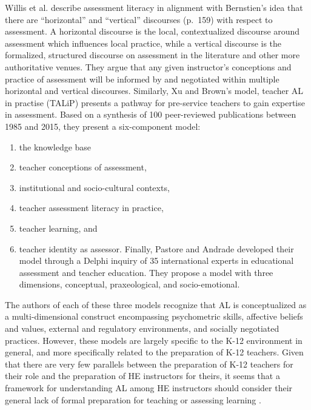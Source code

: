 \documentclass[
]{book}
\providecommand{\tightlist}{%
  \setlength{\itemsep}{0pt}\setlength{\parskip}{0pt}}
\begin{document}
Willis et al. \citeyearpar{willisConceptualisingTeachersAssessment2013} describe assessment literacy in alignment with Bernstien's \citeyearpar{bernsteinVerticalHorizontalDiscourse1999} idea that there are ``horizontal'' and ``vertical'' discourses (p.~159) with respect to assessment. A horizontal discourse is the local, contextualized discourse around assessment which influences local practice, while a vertical discourse is the formalized, structured discourse on assessment in the literature and other more authoritative venues. They argue that any given instructor's conceptions and practice of assessment will be informed by and negotiated within multiple horizontal and vertical discourses. Similarly, Xu and Brown's \citeyearpar{xuTeacherAssessmentLiteracy2016} model, teacher AL in practise (TALiP) presents a pathway for pre-service teachers to gain expertise in assessment. Based on a synthesis of 100 peer-reviewed publications between 1985 and 2015, they present a six-component model:

\begin{enumerate}
\def\labelenumi{\arabic{enumi}.}
\tightlist
\item
  the knowledge base
\item
  teacher conceptions of assessment,
\item
  institutional and socio-cultural contexts,
\item
  teacher assessment literacy in practice,
\item
  teacher learning, and
\item
  teacher identity as assessor.
  Finally, Pastore and Andrade \citeyearpar{pastoreTeacherAssessmentLiteracy2019} developed their model through a Delphi inquiry of 35 international experts in educational assessment and teacher education. They propose a model with three dimensions, conceptual, praxeological, and socio-emotional.
\end{enumerate}

The authors of each of these three models recognize that AL is conceptualized as a multi-dimensional construct encompassing psychometric skills, affective beliefs and values, external and regulatory environments, and socially negotiated practices. However, these models are largely specific to the K-12 environment in general, and more specifically related to the preparation of K-12 teachers. Given that there are very few parallels between the preparation of K-12 teachers for their role and the preparation of HE instructors for theirs, it seems that a framework for understanding AL among HE instructors should consider their general lack of formal preparation for teaching or assessing learning \citep{lipnevichWhatGradesMean2020, masseyAssessmentLiteracyCollege2020}.
\end{document}
